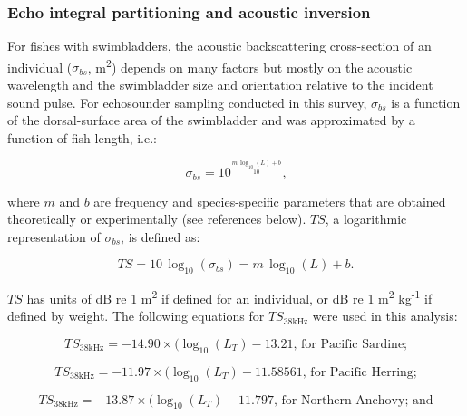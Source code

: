 \documentclass[]{article}
\begin{document}
\hypertarget{methods-echointegration}{%
\subsubsection{Echo integral partitioning and acoustic inversion}\label{methods-echointegration}}

For fishes with swimbladders, the acoustic backscattering cross-section of an individual (\(\sigma_{bs}\), m\textsuperscript{2}) depends on many factors but mostly on the acoustic wavelength and the swimbladder size and orientation relative to the incident sound pulse. For echosounder sampling conducted in this survey, \(\sigma_{bs}\) is a function of the dorsal-surface area of the swimbladder and was approximated by a function of fish length, i.e.:

\begin{equation}
  \sigma_{bs} = 10^{\frac{m\,\log_{10}(L)+b}{10}}\text{,}
  \label{eq:sigma-bs}
\end{equation}

where \(m\) and \(b\) are frequency and species-specific parameters that are obtained theoretically or experimentally (see references below). \(TS\), a logarithmic representation of \(\sigma_{bs}\), is defined as:

\begin{equation}
  TS = 10\,\log_{10}(\sigma_{bs}) = m\,\log_{10}(L) + b\text{.}
  \label{eq:ts-sigma-bs-equation}
\end{equation}

\(TS\) has units of dB re 1 m\textsuperscript{2} if defined for an individual, or dB re 1 m\textsuperscript{2} kg\textsuperscript{-1} if defined by weight. The following equations for \(TS_{38\mathrm{kHz}}\) were used in this analysis:

\begin{equation}
  TS_{\mathrm{38kHz}} = -14.90 \times (\log_{10} (L_T) - 13.21 \text{, for Pacific Sardine;}
  \label{eq:tl-ts-sardine}
\end{equation}

\begin{equation}
  TS_{\mathrm{38kHz}} = -11.97 \times (\log_{10} (L_T) - 11.58561 \text{, for Pacific Herring;}
  \label{eq:tl-ts-herring}
\end{equation}

\begin{equation}
  TS_{\mathrm{38kHz}} = -13.87 \times (\log_{10} (L_T) - 11.797 \text{, for Northern Anchovy; and}
  \label{eq:tl-ts-anchovy}
\end{equation}
\end{document}
